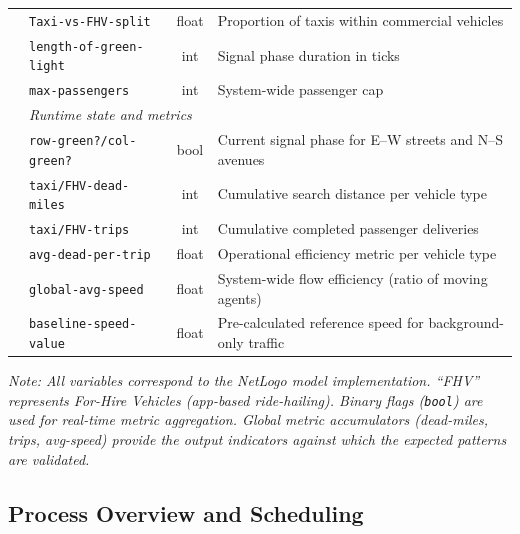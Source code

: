 \documentclass{article}
\begin{document}
\begin{table}[H]
\begin{threeparttable}
\begin{tabularx}{\textwidth}{l l c X}
  & \texttt{Taxi-vs-FHV-split} & float & Proportion of taxis within commercial vehicles \\
  & \texttt{length-of-green-light} & int & Signal phase duration in ticks \\
  & \texttt{max-passengers} & int & System-wide passenger cap \\[4pt]
  & \multicolumn{3}{l}{\textit{Runtime state and metrics}} \\
  & \texttt{row-green?/col-green?} & bool & Current signal phase for E--W streets and N--S avenues \\
  & \texttt{taxi/FHV-dead-miles} & int & Cumulative search distance per vehicle type \\
  & \texttt{taxi/FHV-trips} & int & Cumulative completed passenger deliveries \\
  & \texttt{avg-dead-per-trip} & float & Operational efficiency metric per vehicle type \\
  & \texttt{global-avg-speed} & float & System-wide flow efficiency (ratio of moving agents) \\
  & \texttt{baseline-speed-value} & float & Pre-calculated reference speed for background-only traffic \\
\bottomrule
\end{tabularx}
\begin{tablenotes}
\footnotesize
\item \textit{Note: All variables correspond to the NetLogo model implementation. ``FHV'' represents For-Hire Vehicles (app-based ride-hailing). Binary flags (\texttt{bool}) are used for real-time metric aggregation. Global metric accumulators (dead-miles, trips, avg-speed) provide the output indicators against which the expected patterns are validated.}
\end{tablenotes}
\end{threeparttable}
\end{table}



\subsection{Process Overview and Scheduling}

\end{document}
